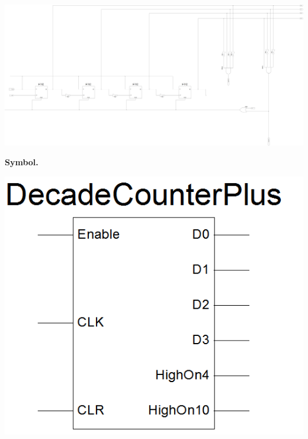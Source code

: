 \documentclass[9pt]{article}
\begin{document}
\begin{enumerate}
             \begin{center}
                \includegraphics[width=\textwidth]{decade_counter_plus.png}
             \end{center}
             
             \newpage
             \textbf{Symbol.}
   
             \begin{center}
                \includegraphics[width=\textwidth]{decade_counter_plus_sym.png}
             \end{center}
             

\end{enumerate}
\end{document}
